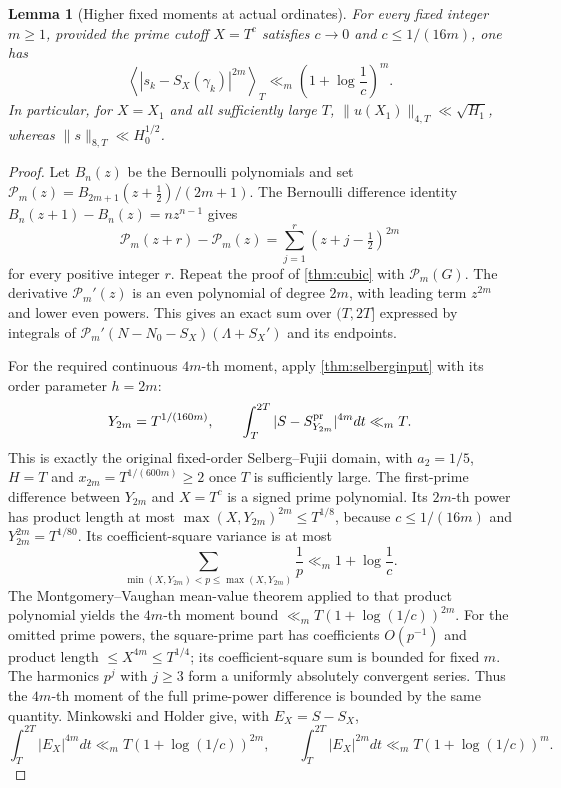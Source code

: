 \documentclass[11pt,reqno]{amsart}
\numberwithin{equation}{section}
\newtheorem{lemma}[theorem]{Lemma}
\newcommand{\av}[1]{\left\langle #1\right\rangle_T}
\begin{document}
\begin{lemma}[Higher fixed moments at actual ordinates]\label{lem:higherordinal}
For every fixed integer $m\ge1$, provided the prime cutoff
$X=T^c$ satisfies $c\to0$ and $c\le1/(16m)$, one has
\begin{equation}\label{eq:higherordinal}
\av{|s_k-S_X(\gamma_k)|^{2m}}
 \ll_m\left(1+\log\frac1c\right)^m.
\end{equation}
In particular, for $X=X_1$ and all sufficiently large $T$,
$\|u(X_1)\|_{4,T}\ll\sqrt{H_1}$, whereas
$\|s\|_{8,T}\ll H_0^{1/2}$.
\end{lemma}
\begin{proof}
Let $B_n(z)$ be the Bernoulli polynomials and set
$\mathcal P_m(z)=B_{2m+1}(z+\frac12)/(2m+1)$.
The Bernoulli difference identity
$B_n(z+1)-B_n(z)=nz^{n-1}$ gives
\[
\mathcal P_m(z+r)-\mathcal P_m(z)
 =\sum_{j=1}^r(z+j-\tfrac12)^{2m}
\]
for every positive integer $r$.
Repeat the proof of \cref{thm:cubic} with $\mathcal P_m(G)$.
The derivative $\mathcal P_m'(z)$ is an even polynomial of degree
$2m$, with leading term $z^{2m}$ and lower even powers.
This gives an exact sum over $(T,2T]$ expressed by integrals of
$\mathcal P_m'(N-N_0-S_X)(\Lambda+S_X')$ and its endpoints.

For the required continuous $4m$-th moment, apply
\cref{thm:selberginput} with its order parameter $h=2m$:
\[
Y_{2m}=T^{1/(160m)},\qquad
\int_T^{2T}|S-S_{Y_{2m}}^{\rm pr}|^{4m}dt\ll_m T.
\]
This is exactly the original fixed-order Selberg--Fujii domain,
with $a_2=1/5$, $H=T$ and
$x_{2m}=T^{1/(600m)}\ge2$ once $T$ is sufficiently large.
The first-prime difference between $Y_{2m}$ and $X=T^c$
is a signed prime polynomial. Its $2m$-th power has
product length at most
$\max(X,Y_{2m})^{2m}\le T^{1/8}$,
because $c\le1/(16m)$ and
$Y_{2m}^{2m}=T^{1/80}$. Its coefficient-square
variance is at most
\[
\sum_{\min(X,Y_{2m})<p\le\max(X,Y_{2m})}\frac1p
\ll_m 1+\log\frac1c.
\]
The Montgomery--Vaughan mean-value theorem applied to
that product polynomial yields the $4m$-th moment bound
$\ll_m T(1+\log(1/c))^{2m}$. For the omitted
prime powers, the square-prime part has coefficients $O(p^{-1})$
and product length $\le X^{4m}\le T^{1/4}$;
its coefficient-square sum is bounded for fixed $m$.
The harmonics $p^j$ with $j\ge3$ form a uniformly
absolutely convergent series. Thus the $4m$-th moment
of the full prime-power difference is bounded by the
same quantity. Minkowski and Holder give, with
$E_X=S-S_X$,
\[
\int_T^{2T}|E_X|^{4m}dt\ll_m
 T(1+\log(1/c))^{2m},\qquad
\int_T^{2T}|E_X|^{2m}dt\ll_m
 T(1+\log(1/c))^{m}.
\]


\end{proof}
\end{document}
